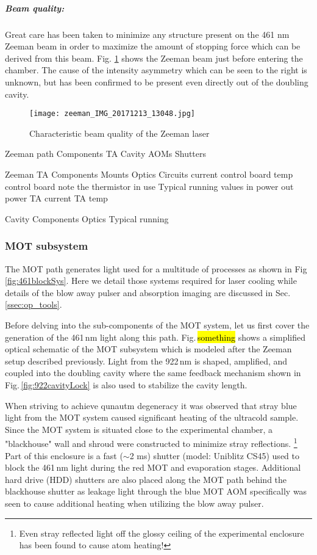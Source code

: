 \subparagraph{Beam quality:}
Great care has been taken to minimize any structure present on the 461 nm Zeeman beam in order to maximize the amount of stopping force which can be derived from this beam.
Fig. \ref{fig:461zeemanBeam} shows the Zeeman beam just before entering the chamber.
The cause of the intensity asymmetry which can be seen to the right is unknown, but has been confirmed to be present even directly out of the doubling cavity.
	\begin{figure}
		\centerline{
		\texttt{[image: zeeman\_IMG\_20171213\_13048.jpg]}}
		\caption{Characteristic beam quality of the Zeeman laser}
		\label{fig:461zeemanBeam}
	\end{figure}

Zeeman path
	Components
		TA
		Cavity
		AOMs
		Shutters
	
	Zeeman TA
		Components
			Mounts
			Optics
			Circuits
				current control board
				temp control board
					note the thermistor in use
		Typical running values
			in power
			out power
			TA current
			TA temp
		
	Cavity
		Components
			Optics
		Typical running
		
\subsubsection{MOT subsystem}

The MOT path generates light used for a multitude of processes as shown in Fig \ref{fig:461blockSys}.
Here we detail those systems required for laser cooling while details of the blow away pulser and absorption imaging are discussed in Sec. \ref{ssec:op_tools}.

Before delving into the sub-components of the MOT system, let us first cover the generation of the 461\,nm light along this path.
Fig.\,\hl{something} shows a simplified optical schematic of the MOT subsystem which is modeled after the Zeeman setup described previously.
Light from the 922\,nm is shaped, amplified, and coupled into the doubling cavity where the same feedback mechanism shown in Fig.\,\ref{fig:922cavityLock} is also used to stabilize the cavity length.

When striving to achieve qunautm degeneracy it was observed that stray blue light from the MOT system caused significant heating of the ultracold sample. 
Since the MOT system is situated close to the experimental chamber, a "blackhouse" wall and shroud were constructed to minimize stray reflections.
\footnote{Even stray reflected light off the glossy ceiling of the experimental enclosure has been found to cause atom heating!}
Part of this enclosure is a fast ($\sim$2 ms) shutter (model: Uniblitz CS45) used to block the 461\,nm light during the red MOT and evaporation stages.
Additional hard drive (HDD) shutters are also placed along the MOT path behind the blackhouse shutter as leakage light through the blue MOT AOM specifically was seen to cause additional heating when utilizing the blow away pulser.

